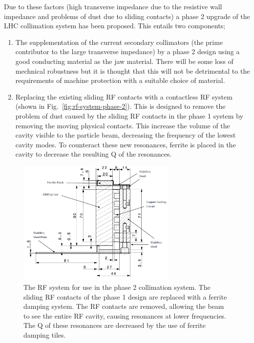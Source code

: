 Due to these factors (high transverse impedance due to the resistive wall impedance and problems of dust due to sliding contacts) a phase 2 upgrade of the LHC collimation system has been proposed. This entails two components;

\begin{enumerate}
\item{The supplementation of the current secondary collimators (the prime contributor to the large transverse impedance) by a phase 2 design using a good conducting material as the jaw material. There will be some loss of mechnical robustness but it is thought that this will not be detrimental to the requirements of machine protection with a suitable choice of material.}
\item{Replacing the existing sliding RF contacts with a contactless RF system (shown in Fig.~\ref{fig:rf-system-phase-2}). This is designed to remove the problem of dust caused by the sliding RF contacts in the phase 1 system by removing the moving physical contacts. This increase the volume of the cavity visible to the particle beam, decreasing the frequency of the lowest cavity modes. To counteract these new resonances, ferrite is placed in the cavity to decrease the resulting Q of the resonances.}
\end{enumerate}

\begin{figure}
\begin{center}
\includegraphics[width=0.7\textwidth]{LHC_Collimation_Upgrades/figures/cu-geo.png}
\end{center}
\label{fig:phase-2-rf-system}
\caption{The RF system for use in the phase 2 collimation system. The sliding RF contacts of the phase 1 design are replaced with a ferrite damping system. The RF contacts are removed, allowing the beam to see the entire RF cavity, causing resonances at lower frequencies. The Q of these resonances are decreased by the use of ferrite damping tiles.}
\end{figure}

